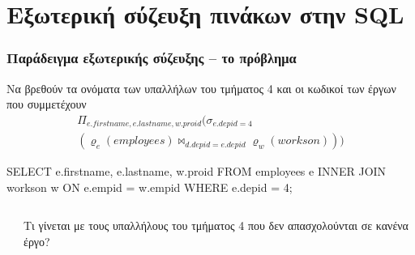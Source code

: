 \section[]{\textgreek{Εξωτερική σύζευξη πινάκων στην \textlatin{SQL}}}


\begin{frame}
\frametitle{Παράδειγμα εξωτερικής σύζευξης -- το πρόβλημα}
\begin{minipage}{\wE}
\vspace*{-0.5cm}
\begin{exampleblock}{\small Να βρεθούν τα ονόματα των υπαλλήλων του τμήματος 4
              και οι κωδικοί των έργων που συμμετέχουν}
\en
\[
\begin{array}{l}
  \Pi_{e.firstname, e.lastname, w.proid}
  (\sigma_{e.depid=4}                    \\
    ( \varrho_{e} (employees) \bowtie_{d.depid=e.depid} \varrho_{w} (workson) )
  )
\end{array}
\]
\pause
\vspace*{-0.5cm}
\begin{SQL}
  SELECT e.firstname, e.lastname, w.proid
    FROM employees e INNER JOIN workson w
         ON e.empid = w.empid
   WHERE e.depid = 4;
\end{SQL}
\el
\end{exampleblock}
\small
\begin{columns}
\begin{column}{0.55\linewidth}
\end{column}
\begin{column}{0.5\linewidth}
  \par \color{red} Τι γίνεται με τους υπαλλήλους του τμήματος 4 που δεν απασχολούνται σε κανένα έργο?
\end{column}
\end{columns}
\end{minipage}
\end{frame}


